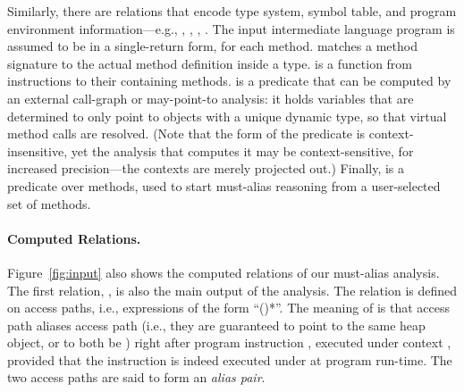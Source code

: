 Similarly, there are relations that encode type system, symbol table, and
program environment information---e.g., , ,
, . 
The input intermediate language program is assumed to
be in a single-return form, for each method.
matches a method signature to the actual method definition inside a
type.   is a function from instructions to their
containing methods.  is a predicate that can be
computed by an external call-graph or may-point-to analysis: it holds
variables that are determined to only point to objects with a unique
dynamic type, so that virtual method calls are resolved. (Note that
the form of the predicate is context-insensitive, yet the analysis
that computes it may be context-sensitive, for increased
precision---the contexts are merely projected out.)  Finally,
 is a predicate over methods, used to start
must-alias reasoning from a user-selected set of methods.

\paragraph{Computed Relations.}

Figure~\ref{fig:input} also shows the computed relations of our must-alias
analysis. The first relation, , is also the main output of
the analysis. The relation is defined on access paths, i.e., expressions of the
form ``()*''.  The meaning of  is that access path  aliases access path  (i.e.,
they are guaranteed to point to the same heap object, or to both be )
right after program instruction , executed under context ,
provided that the instruction is indeed executed under  at program
run-time. The two access paths are said to form an \emph{alias pair}.  
 
